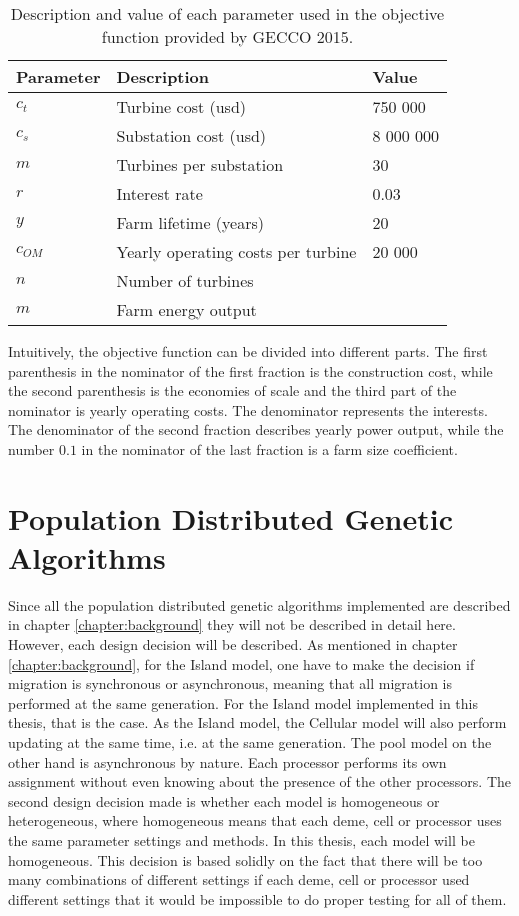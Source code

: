 \begin{table}[h!]
\begin{center}
\caption{Description and value of each parameter used in the objective function provided by GECCO 2015.}
\label{Parameters}
\begin{tabular}{l|l|l}
\textbf{Parameter} & \textbf{Description} & \textbf{Value} \\ 
\hline 
$c_t$ & Turbine cost (usd) & 750 000 \\ 
$c_s$ & Substation cost (usd) & 8 000 000 \\ 
$m$ & Turbines per substation & 30 \\ 
$r$ & Interest rate & 0.03 \\ 
$y$ & Farm lifetime (years) & 20 \\ 
$c_{OM}$ & Yearly operating costs per turbine & 20 000 \\ 
$n$ & Number of turbines &  \\ 
$m$ & Farm energy output &  \\  
\end{tabular} 
\end{center}
\end{table}


\noindent Intuitively, the objective function can be divided into different parts. The first parenthesis in the nominator of the first fraction is the construction cost, while the second parenthesis is the economies of scale and the third part of the nominator is yearly operating costs. The denominator represents the interests. The denominator of the second fraction describes yearly power output, while the number $0.1$ in the nominator of the last fraction is a farm size coefficient. \\


\section{Population Distributed Genetic Algorithms}\label{section:population distributed gas}
Since all the population distributed genetic algorithms implemented are described in chapter \ref{chapter:background} they will not be described in detail here. However, each design decision will be described. As mentioned in chapter \ref{chapter:background}, for the Island model, one have to make the decision if migration is synchronous or asynchronous, meaning that all migration is performed at the same generation. For the Island model implemented in this thesis, that is the case. As the Island model, the Cellular model will also perform updating at the same time, i.e. at the same generation. The pool model on the other hand is asynchronous by nature. Each processor performs its own assignment without even knowing about the presence of the other processors. The second design decision made is whether each model is homogeneous or heterogeneous, where homogeneous means that each deme, cell or processor uses the same parameter settings and methods. In this thesis, each model will be homogeneous. This decision is based solidly on the fact that there will be too many combinations of different settings if each deme, cell or processor used different settings that it would be impossible to do proper testing for all of them. 


